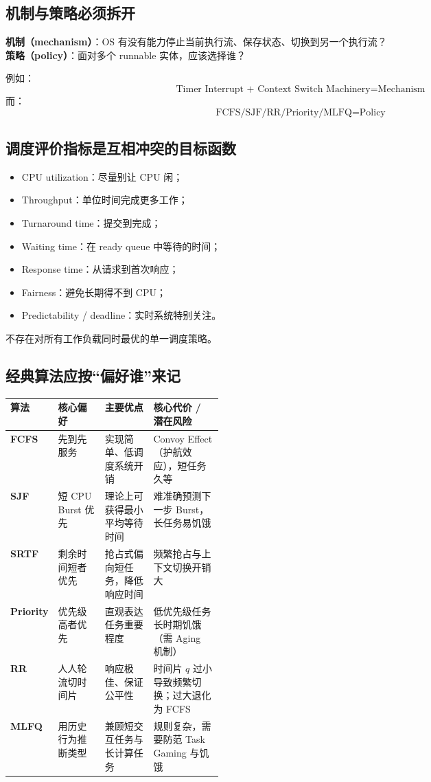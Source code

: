 \documentclass[11pt,a4paper]{ctexart}
\begin{document}
\subsection{机制与策略必须拆开}

\begin{corebox}[机制 / 策略]
\textbf{机制（mechanism）}：OS 有没有能力停止当前执行流、保存状态、切换到另一个执行流？\\
\textbf{策略（policy）}：面对多个 runnable 实体，应该选择谁？
\end{corebox}

例如：
\[
\text{Timer Interrupt + Context Switch Machinery}=\text{Mechanism}
\]
而：
\[
\text{FCFS/SJF/RR/Priority/MLFQ}=\text{Policy}
\]

\subsection{调度评价指标是互相冲突的目标函数}

\begin{itemize}
\item CPU utilization：尽量别让 CPU 闲；
\item Throughput：单位时间完成更多工作；
\item Turnaround time：提交到完成；
\item Waiting time：在 ready queue 中等待的时间；
\item Response time：从请求到首次响应；
\item Fairness：避免长期得不到 CPU；
\item Predictability / deadline：实时系统特别关注。
\end{itemize}

不存在对所有工作负载同时最优的单一调度策略。

\subsection{经典算法应按“偏好谁”来记}

\begingroup
\small
\renewcommand{\arraystretch}{1.25}
\setlength{\tabcolsep}{5pt}
\begin{tabularx}{\linewidth}{>{\bfseries}p{0.14\linewidth} p{0.22\linewidth} X X}
\toprule
算法 & 核心偏好 & 主要优点 & 核心代价 / 潜在风险\\
\midrule
FCFS & 先到先服务 & 实现简单、低调度系统开销 & Convoy Effect（护航效应），短任务久等\\
SJF & 短 CPU Burst 优先 & 理论上可获得最小平均等待时间 & 难准确预测下一步 Burst，长任务易饥饿\\
SRTF & 剩余时间短者优先 & 抢占式偏向短任务，降低响应时间 & 频繁抢占与上下文切换开销大\\
Priority & 优先级高者优先 & 直观表达任务重要程度 & 低优先级任务长时期饥饿（需 Aging 机制）\\
RR & 人人轮流切时间片 & 响应极佳、保证公平性 & 时间片 $q$ 过小导致频繁切换；过大退化为 FCFS\\
MLFQ & 用历史行为推断类型 & 兼顾短交互任务与长计算任务 & 规则复杂，需要防范 Task Gaming 与饥饿\\
\bottomrule
\end{tabularx}
\endgroup
\end{document}
